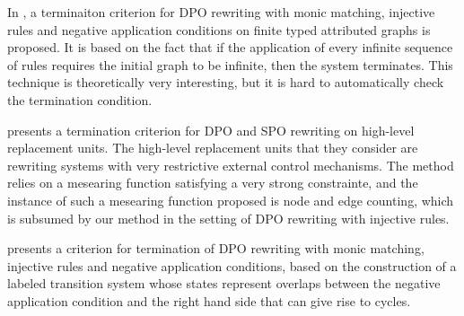 In \cite{LEVENDOVSZKY200787}, a terminaiton criterion for DPO rewriting with monic matching, injective rules and negative application conditions on finite typed attributed graphs is proposed. It is based on the fact that if the application of every infinite sequence of rules requires the initial graph to be infinite, then the system terminates. This technique is theoretically very interesting, but it is hard to automatically check the termination condition.

\cite{bottoni2005termination} presents a termination criterion for DPO and SPO rewriting on high-level replacement units. The high-level replacement units that they consider are rewriting systems with very restrictive external control mechanisms. The method relies on a mesearing function satisfying a very strong constrainte, and the instance of such a mesearing function proposed is node and edge counting, which is subsumed by our method in the setting of DPO rewriting with injective rules.

\cite{Bottoni2010_termination} presents a criterion for termination of DPO rewriting with monic matching, injective rules and negative application conditions, based on the construction of a labeled transition system whose states represent overlaps between the negative application condition and the right hand side that can give rise to cycles.

